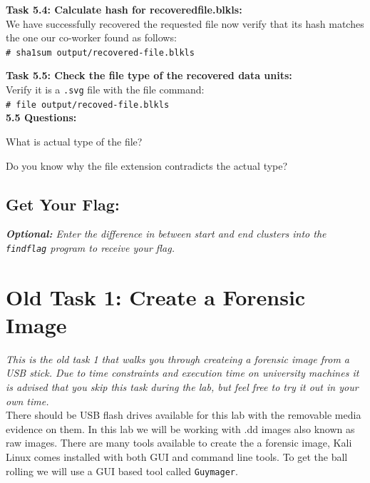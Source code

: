 \documentclass[a4paper,11pt]{article}
\begin{document}
{\noindent
\textbf{Task 5.4: Calculate hash for recoveredfile.blkls:}\\
We have successfully recovered the requested file now verify that its hash matches the one our co-worker found as follows: \\

\noindent
\verb|# sha1sum output/recovered-file.blkls|
}\\

{\noindent
\textbf{Task 5.5: Check the file type of the recovered data units:}\\
Verify it is a \texttt{.svg} file with the file command:\\

\noindent
\verb|# file output/recoved-file.blkls|\\

\noindent
\textbf{5.5 Questions:}
\begin{enumerate*}
	\item What is actual type of the file?
	\item Do you know why the file extension contradicts the actual type?\\
\end{enumerate*}	
}
\subsection*{Get Your Flag:}
\noindent
\textit{\textbf{Optional:} Enter the difference in between start and end clusters into the \texttt{findflag} program to receive your flag.}


\section{Old Task 1: Create a Forensic Image}\label{sec:task1-forensic-image}

\textit{This is the old task 1 that walks you through createing a forensic image from a USB stick. Due to time constraints and execution time on university machines it is advised that you skip this task during the lab, but feel free to try it out in your own time.}\\



There should be USB flash drives available for this lab with the removable media evidence on them.  In this lab we will be working with .dd images also known as raw images. There are many tools available to create the a forensic image, Kali Linux comes installed with both GUI and command line tools. To get the ball rolling we will use a GUI based tool called \texttt{Guymager}.\\
\end{document}
